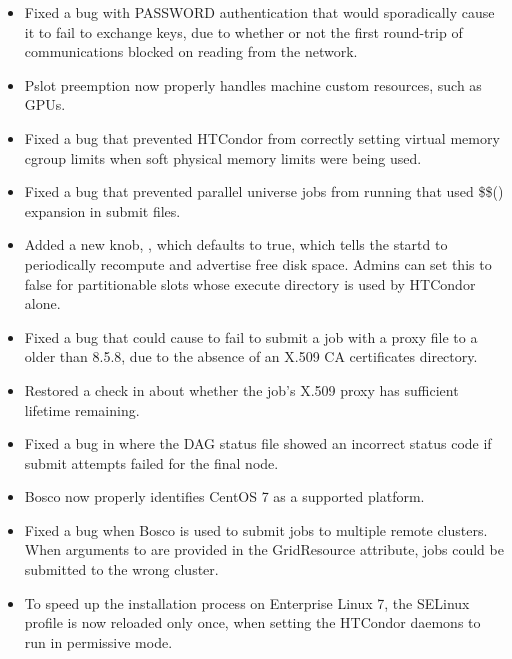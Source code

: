\begin{itemize}

\item Fixed a bug with PASSWORD authentication that would sporadically cause
it to fail to exchange keys, due to whether or not the first round-trip of
communications blocked on reading from the network.

\item Pslot preemption now properly handles machine custom resources,
such as GPUs.

\item Fixed a bug that prevented HTCondor from correctly setting
virtual memory cgroup limits when soft physical memory limits
were being used.

\item Fixed a bug that prevented parallel universe jobs from running
that used \$\$() expansion in submit files.

\item Added a new knob, , which defaults
to true, which tells the startd to periodically recompute and advertise free
disk space.  Admins can set this to false for partitionable slots whose execute
directory is used by HTCondor alone.

\item Fixed a bug that could cause  to fail to submit a
job with a proxy file to a  older than 8.5.8, due to the
absence of an X.509 CA certificates directory.

\item Restored a check in  about whether the job's X.509
proxy has sufficient lifetime remaining.

\item Fixed a bug in  where the DAG status file showed an
incorrect status code if submit attempts failed for the final node.

\item Bosco now properly identifies CentOS 7 as a supported platform.

\item Fixed a bug when Bosco is used to submit jobs to multiple remote
clusters. When arguments to  are provided in the
GridResource attribute, jobs could be submitted to the wrong cluster.

\item To speed up the installation process on Enterprise Linux 7, the
SELinux profile is now reloaded only once, when setting the HTCondor
daemons to run in permissive mode.


\end{itemize}
